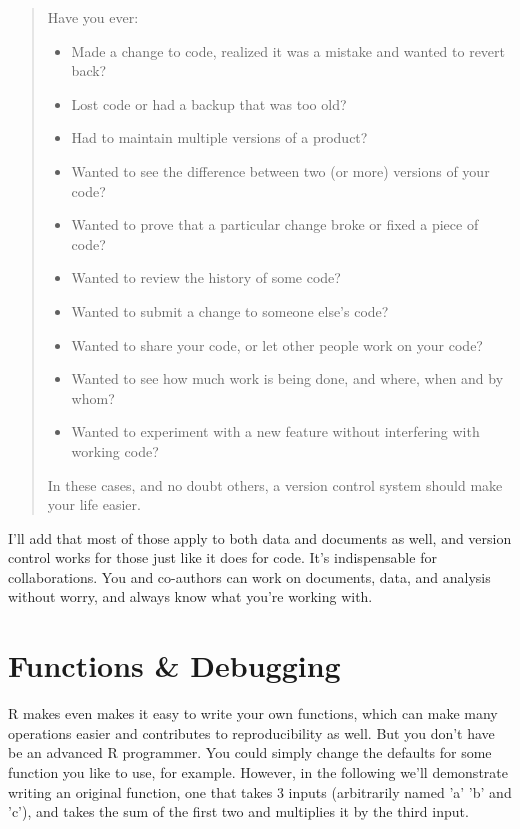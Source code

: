 \documentclass[english,nohyper,titlepage]{tufte-handout}\usepackage[]{graphicx}\usepackage[]{color}
\begin{document}
\begin{quote}
Have you ever:
\begin{itemize}
  \item Made a change to code, realized it was a mistake and wanted to revert back?
  \item Lost code or had a backup that was too old?
  \item Had to maintain multiple versions of a product?
  \item Wanted to see the difference between two (or more) versions of your code?
  \item Wanted to prove that a particular change broke or fixed a piece of code?
  \item Wanted to review the history of some code?
  \item Wanted to submit a change to someone else's code?
  \item Wanted to share your code, or let other people work on your code?
  \item Wanted to see how much work is being done, and where, when and by whom?
  \item Wanted to experiment with a new feature without interfering with working code?
\end{itemize}

In these cases, and no doubt others, a version control system should make your life easier. 
\end{quote}

I'll add that most of those apply to both data and documents as well, and version control works for those just like it does for code.  It's indispensable for collaborations.  You and co-authors can work on documents, data, and analysis without worry, and always know what you're working with.


\section{Functions \& Debugging}
R makes even makes it easy to write your own functions, which can make many operations easier and contributes to reproducibility as well.  But you don't have be an advanced R programmer.  You could simply change the defaults for some function you like to use, for example.  However, in the following we'll demonstrate writing an original function, one that takes 3 inputs (arbitrarily named 'a' 'b' and 'c'), and takes the sum of the first two and multiplies it by the third input.
\end{document}
